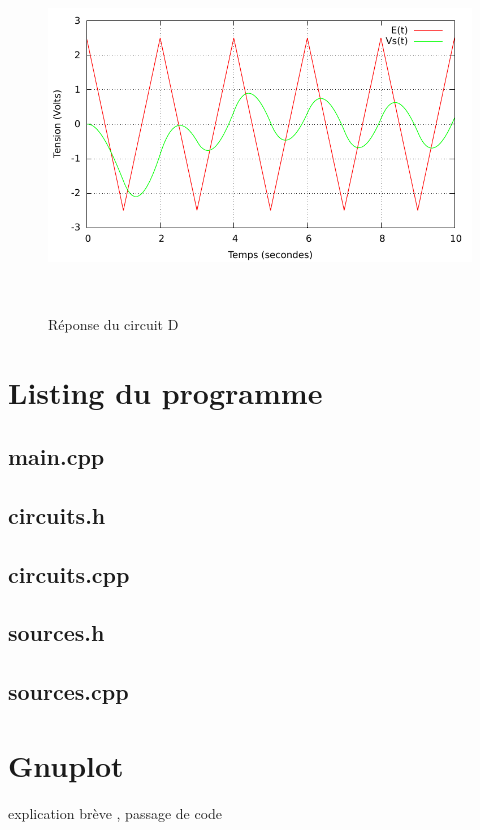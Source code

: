 \documentclass[a4paper,11pt]{article}
\begin{document}
\begin{figure}[h!]
\begin{minipage}[b]{0.5\linewidth}
   \end{minipage}
  \begin{minipage}[b]{0.5\linewidth}   
      \centering \includegraphics[scale=.68]{CDtriangle.pdf}
   \end{minipage}\\
 \caption{Réponse du circuit D}
\end{figure}




  \newpage
  \appendix
  \section{Listing du programme}
  \subsection{main.cpp}
    
    \newpage
  \subsection{circuits.h}
    
    \newpage
  \subsection{circuits.cpp}
    
    \newpage
   \subsection{sources.h}
    
    \newpage
   \subsection{sources.cpp}
    
    \newpage
  \section{Gnuplot}
    explication brève , passage de code
    
\end{document}
